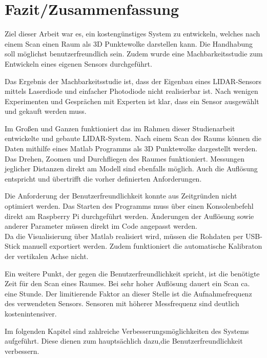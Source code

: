 \chapter{Fazit/Zusammenfassung}\label{chap:fazit}

Ziel dieser Arbeit war es, ein kostengünstiges System zu entwickeln, welches nach einem Scan einen Raum als 3D Punktewolke darstellen kann. Die Handhabung soll möglichst benutzerfreundlich sein. Zudem wurde eine Machbarkeitsstudie zum Entwickeln eines eigenen Sensors durchgeführt.

Das Ergebnis der Machbarkeitsstudie ist, dass der Eigenbau eines \ac{LIDAR}-Sensors mittels Laserdiode und einfacher Photodiode nicht realisierbar ist. Nach wenigen Experimenten und Gesprächen mit Experten ist klar, dass ein Sensor ausgewählt und gekauft werden muss.

Im Großen und Ganzen funktioniert das im Rahmen dieser Studienarbeit entwickelte und gebaute \ac{LIDAR}-System. Nach einem Scan des Raums können die Daten mithilfe eines Matlab Programms als 3D Punktewolke dargestellt werden. Das Drehen, Zoomen und Durchfliegen des Raumes funktioniert. Messungen jeglicher Distanzen direkt am Modell sind ebenfalls möglich. Auch die Auflösung entspricht und übertrifft die vorher definierten Anforderungen.


Die Anforderung der Benutzerfreundlichkeit konnte aus Zeitgründen nicht optimiert werden. Das Starten des Programms muss über einen Konsolenbefehl direkt am Raspberry Pi durchgeführt werden. Änderungen der Auflösung sowie anderer Parameter müssen direkt im Code angepasst werden.\\
Da die Visualisierung über Matlab realisiert wird, müssen die Rohdaten per USB-Stick manuell exportiert werden. Zudem funktioniert die automatische Kalibraton der vertikalen Achse nicht.

Ein weitere Punkt, der gegen die Benutzerfreundlichkeit spricht, ist die benötigte Zeit für den Scan eines Raumes. Bei sehr hoher Auflösung dauert ein Scan ca. eine Stunde. Der limitierende Faktor an dieser Stelle ist die Aufnahmefrequenz des verwendeten Sensors. Sensoren mit höherer Messfrequenz sind deutlich kostenintensiver.

Im folgenden Kapitel sind zahlreiche Verbesserungsmöglichkeiten des Systems aufgeführt. Diese dienen zum hauptsächlich dazu,die Benutzerfreundlichkeit verbessern.


